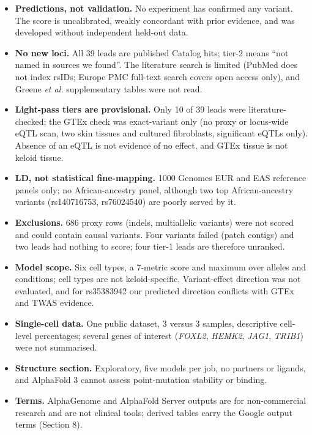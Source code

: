\documentclass[10pt,twocolumn,a4paper]{article}
\providecommand{\tightlist}{}
\begin{document}
\begin{itemize}
\tightlist
\item
  \textbf{Predictions, not validation.} No experiment has confirmed any variant. The score is uncalibrated, weakly concordant with prior evidence, and was developed without independent held-out data.
\item
  \textbf{No new loci.} All 39 leads are published Catalog hits; tier-2 means ``not named in sources we found''. The literature search is limited (PubMed does not index rsIDs; Europe PMC full-text search covers open access only), and Greene \emph{et al.} supplementary tables were not read.
\item
  \textbf{Light-pass tiers are provisional.} Only 10 of 39 leads were literature-checked; the GTEx check was exact-variant only (no proxy or locus-wide eQTL scan, two skin tissues and cultured fibroblasts, significant eQTLs only). Absence of an eQTL is not evidence of no effect, and GTEx tissue is not keloid tissue.
\item
  \textbf{LD, not statistical fine-mapping.} 1000 Genomes EUR and EAS reference panels only; no African-ancestry panel, although two top African-ancestry variants (rs140716753, rs76024540) are poorly served by it.
\item
  \textbf{Exclusions.} 686 proxy rows (indels, multiallelic variants) were not scored and could contain causal variants. Four variants failed (patch contigs) and two leads had nothing to score; four tier-1 leads are therefore unranked.
\item
  \textbf{Model scope.} Six cell types, a 7-metric score and maximum over alleles and conditions; cell types are not keloid-specific. Variant-effect direction was not evaluated, and for rs35383942 our predicted direction conflicts with GTEx and TWAS evidence.
\item
  \textbf{Single-cell data.} One public dataset, 3 versus 3 samples, descriptive cell-level percentages; several genes of interest (\emph{FOXL2}, \emph{HEMK2}, \emph{JAG1}, \emph{TRIB1}) were not summarised.
\item
  \textbf{Structure section.} Exploratory, five models per job, no partners or ligands, and AlphaFold 3 cannot assess point-mutation stability or binding.
\item
  \textbf{Terms.} AlphaGenome and AlphaFold Server outputs are for non-commercial research and are not clinical tools; derived tables carry the Google output terms (Section 8).
\end{itemize}
\end{document}
